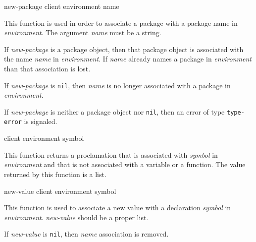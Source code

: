  {new-package client environment name}

This function is used in order to associate a package with a package
name in \textit{environment}.  The argument \textit{name} must be a
string.

If \textit{new-package} is a package object, then that package object
is associated with the name \textit{name} in
\textit{environment}.  If \textit{name} already names a package in
\textit{environment} than that association is lost.

If \textit{new-package} is \texttt{nil}, then \textit{name} is no
longer associated with a package in \textit{environment}.

If \textit{new-package} is neither a package object nor \texttt{nil},
then an error of type \texttt{type-error} is signaled.

 {client environment symbol}

This function returns a proclamation that is associated with
\textit{symbol} in \textit{environment} and that is not associated with a
variable or a function.  The value returned by this function is a list.

 {new-value client environment symbol}

This function is used to associate a new value with a declaration
\textit{symbol} in \textit{environment}. \textit{new-value} should be
a proper list.

If \textit{new-value} is \texttt{nil}, then \textit{name} association is removed.
